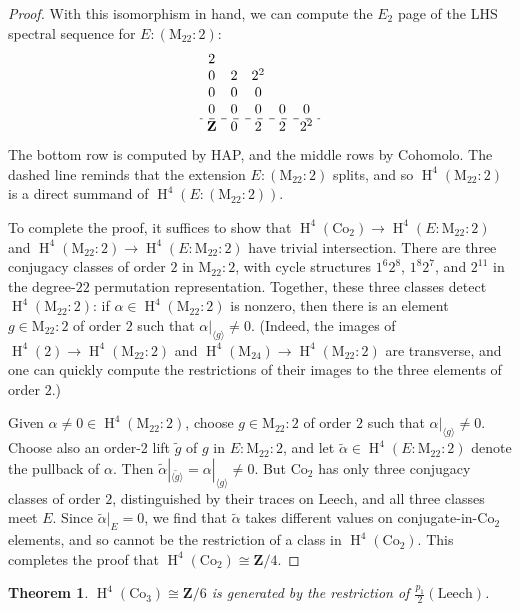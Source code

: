 \documentclass[pdftex]{sigma}
\numberwithin{equation}{section}
\newtheorem{Theorem}{Theorem}[section]
\newcommand\bZ{\mathbf Z}
\newcommand\rM{\mathrm M}
\DeclareMathOperator\homology{H}
\renewcommand\H{\homology}
\newcommand\<\langle
\renewcommand\>\rangle
\newcommand\Co{\mathrm{Co}}
\newcommand\Leech{\mathrm{Leech}}
\begin{document}
\begin{proof}
 With this isomorphism in hand, we can compute the $E_2$ page of the LHS spectral sequence for $E\colon (\rM_{22}:2)$:
 \begin{gather*}
 \begin{array}{ccccc}
 2 \\
 0 & 2 & 2^2 \\
 0 & 0 & 0 \\
 0 & 0 & 0 & 0 & 0 \\ \hdashline
 \bZ & 0 & 2 & 2 & 2^2
 \end{array}
 \end{gather*}
 The bottom row is computed by HAP, and the middle rows by Cohomolo. The dashed line reminds that the extension $E\colon (\rM_{22}:2)$ splits, and so $\H^4(\rM_{22}:2)$ is a direct summand of $\H^4(E\colon (\rM_{22}:2))$.

To complete the proof, it suffices to show that $\H^4(\Co_2) \to \H^4(E:\rM_{22}:2)$ and $\H^4(\rM_{22}:2) \to \H^4(E:\rM_{22}:2)$ have trivial intersection. There are three conjugacy classes of order $2$ in $\rM_{22}:2$, with cycle structures $1^6 2^8$, $1^8 2^7$, and $2^{11}$ in the degree-$22$ permutation representation. Together, these three classes detect $\H^4(\rM_{22}:2)$: if $\alpha \in \H^4(\rM_{22}:2)$ is nonzero, then there is an element $g \in\rM_{22}:2$ of order $2$ such that $\alpha|_{\langle g\rangle} \neq 0$. (Indeed, the images of $\H^4(2) \to \H^4(\rM_{22}:2)$ and $\H^4(\rM_{24}) \to \H^4(\rM_{22}:2)$ are transverse, and one can quickly compute the restrictions of their images to the three elements of order $2$.)

Given $\alpha \neq 0 \in \H^4(\rM_{22}:2)$, choose $g \in\rM_{22}:2$ of order $2$ such that $\alpha|_{\langle g\rangle} \neq 0$. Choose also an order-2 lift $\tilde g$ of $g$ in $E:\rM_{22}:2$, and let $\tilde\alpha \in \H^4(E:\rM_{22}:2)$ denote the pullback of $\alpha$. Then $\tilde\alpha|_{\langle\tilde g\rangle} = \alpha|_{\langle g\rangle} \neq 0$. But $\Co_2$ has only three conjugacy classes of order $2$, distinguished by their traces on $\Leech$, and all three classes meet $E$. Since $\tilde\alpha|_{E} = 0$, we find that $\tilde\alpha$ takes different values on conjugate-in-$\Co_2$ elements, and so cannot be the restriction of a class in $\H^4(\Co_2)$. This completes the proof that $\H^4(\Co_2) \cong \bZ/4$.
\end{proof}

\begin{Theorem}\label{thm.co3}
 $\H^4(\Co_3) \cong \bZ/6$ is generated by the restriction of $\frac{p_1}2(\Leech)$.
\end{Theorem}
\end{document}
